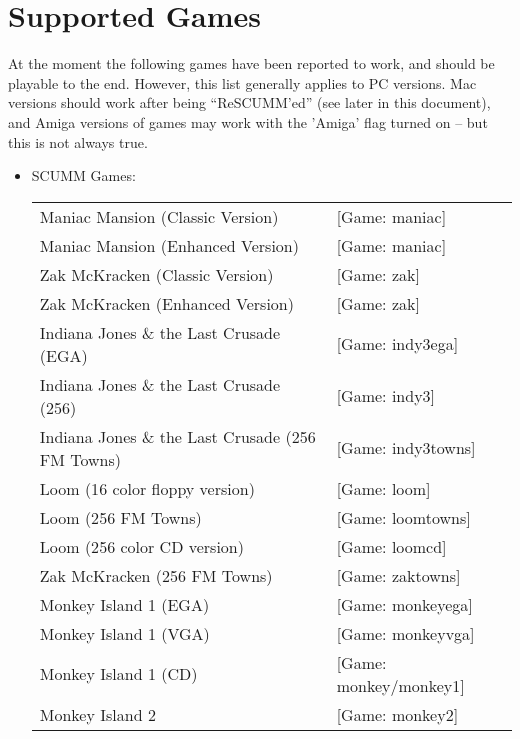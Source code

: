 


\section{Supported Games}

At the moment the following games have been reported to work, and should
be playable to the end. However, this list generally applies to PC versions.
Mac versions should work after being ``ReSCUMM'ed'' (see later in this document),
and Amiga versions of games may work with the 'Amiga' flag turned on -- but
this is not always true.

\begin{itemize}
\item SCUMM Games:\\
  \begin {tabular} [h] {ll}
    Maniac Mansion (Classic Version)&                [Game: maniac]\\
    Maniac Mansion (Enhanced Version)&               [Game: maniac]\\
    Zak McKracken (Classic Version)&                 [Game: zak]\\
    Zak McKracken (Enhanced Version)&                [Game: zak]\\
    Indiana Jones \& the Last Crusade (EGA)&          [Game: indy3ega]\\
    Indiana Jones \& the Last Crusade (256)&          [Game: indy3]\\
    Indiana Jones \& the Last Crusade (256 FM Towns)& [Game: indy3towns]\\
    Loom (16 color floppy version)&                  [Game: loom]\\
    Loom (256 FM Towns)&                             [Game: loomtowns]\\
    Loom (256 color CD version)&                     [Game: loomcd]\\
    Zak McKracken (256 FM Towns)&                    [Game: zaktowns]\\
    Monkey Island 1 (EGA)&                           [Game: monkeyega]\\
    Monkey Island 1 (VGA)&                           [Game: monkeyvga]\\
    Monkey Island 1 (CD)&                            [Game: monkey/monkey1]\\
    Monkey Island 2&                                 [Game: monkey2]\\

\end{tabular}
\end{itemize}
